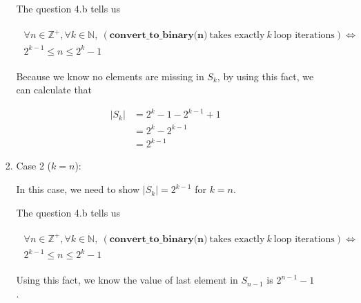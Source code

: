 \documentclass[12pt]{article}
\begin{document}
\begin{enumerate}[a.]
\begin{mdframed}
\begin{enumerate}[1.]
\begin{enumerate}[1.]
\begin{mdframed}
            \bigskip

            The question 4.b tells us

            \begin{align}
                \begin{split}
                \forall n \in \mathbb{Z}^+, \forall k \in \mathbb{N},\: (\textbf{
                convert\_to\_binary(n)}\:\text{takes exactly}\:k\:\text{loop iterations}) \Leftrightarrow
                \\ 2^{k-1} \leq n \leq 2^k -1
                \end{split}
            \end{align}

            \bigskip

            Because we know no elements are missing in $S_k$,
            by using this fact, we can calculate that

            \begin{align}
                \lvert S_k \rvert &= 2^k -1 - 2^{k-1} + 1\\
                &= 2^k - 2^{k-1}\\
                &= 2^{k-1}
            \end{align}
            \end{mdframed}

            \item Case 2 ($k = n$):

            \begin{mdframed}
            In this case, we need to show $\lvert S_k \rvert = 2^{k-1}$
            for $k = n$.

            \bigskip

            The question 4.b tells us

            \begin{align}
                \begin{split}
                \forall n \in \mathbb{Z}^+, \forall k \in \mathbb{N},\: (\textbf{
                convert\_to\_binary(n)}\:\text{takes exactly}\:k\:\text{loop iterations}) \Leftrightarrow
                \\ 2^{k-1} \leq n \leq 2^k -1
                \end{split}
            \end{align}

            \bigskip

            Using this fact, we know the value of last element in $S_{n-1}$
            is $2^{n-1} - 1$.


\end{mdframed}
\end{enumerate}
\end{enumerate}
\end{mdframed}
\end{enumerate}
\end{document}
